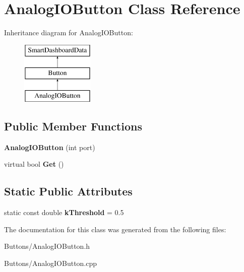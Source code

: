 \hypertarget{classAnalogIOButton}{
\section{AnalogIOButton Class Reference}
\label{classAnalogIOButton}
}
Inheritance diagram for AnalogIOButton:\begin{figure}[H]
\begin{center}
\leavevmode
\includegraphics[height=3.000000cm]{classAnalogIOButton}
\end{center}
\end{figure}
\subsection*{Public Member Functions}
\begin{DoxyCompactItemize}
\item 
\hypertarget{classAnalogIOButton_a2f31580f73f9c67d58f655353062bc3e}{
{\bfseries AnalogIOButton} (int port)}
\label{classAnalogIOButton_a2f31580f73f9c67d58f655353062bc3e}

\item 
\hypertarget{classAnalogIOButton_a45bdb1112c0cdaf1353d0b8ea9106d62}{
virtual bool {\bfseries Get} ()}
\label{classAnalogIOButton_a45bdb1112c0cdaf1353d0b8ea9106d62}

\end{DoxyCompactItemize}
\subsection*{Static Public Attributes}
\begin{DoxyCompactItemize}
\item 
\hypertarget{classAnalogIOButton_a3b713be1d4fe4e9b456e6dde68520c0d}{
static const double {\bfseries kThreshold} = 0.5}
\label{classAnalogIOButton_a3b713be1d4fe4e9b456e6dde68520c0d}

\end{DoxyCompactItemize}


The documentation for this class was generated from the following files:\begin{DoxyCompactItemize}
\item 
Buttons/AnalogIOButton.h\item 
Buttons/AnalogIOButton.cpp\end{DoxyCompactItemize}
